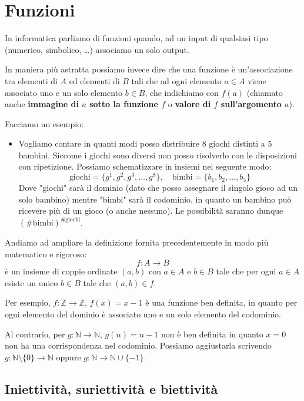 \documentclass[12pt]{report}
\newcommand{\N}{\mathbb{N}}
\newcommand{\Z}{\mathbb{Z}}
\begin{document}
	\chapter{Funzioni}
	
	In informatica parliamo di funzioni quando, ad un input di qualsiasi tipo (numerico, simbolico, \dots) associamo un solo output.
	
	In maniera più astratta possiamo invece dire che una funzione è un'associazione tra elementi di $A$ ed elementi di $B$ tali che ad ogni elemento $a \in A$ viene associato uno e un solo elemento $b \in B$, che indichiamo con $f(a)$ (chiamato anche \textbf{immagine di $a$ sotto la funzione $f$} o \textbf{valore di $f$ sull'argomento $a$}).
	
	Facciamo un esempio:
	\begin{itemize}
		\item Vogliamo contare in quanti modi posso distribuire $8$ giochi distinti a $5$ bambini. Siccome i giochi sono diversi non posso risolverlo con le disposizioni con ripetizione. Possiamo schematizzare in insiemi nel seguente modo:
		\[
		\text{giochi} = \{g^1, g^2, g^3, \dots, g^8\}, \quad \text{bimbi} = \{b_1, b_2, \dots, b_5\}
		\]
		Dove "giochi" sarà il dominio (dato che posso assegnare il singolo gioco ad un solo bambino) mentre "bimbi" sarà il codominio, in quanto un bambino può ricevere più di un gioco (o anche nessuno).
		Le possibilità saranno dunque $(\#\text{bimbi})^{\#\text{giochi}}$.
	\end{itemize}
	
	Andiamo ad ampliare la definizione fornita precedentemente in modo più matematico e rigoroso:
	\[
	f: A \to B
	\]
	è un insieme di coppie ordinate $(a, b)$ con $a \in A$ e $b \in B$ tale che per ogni $a \in A$ esiste un unico $b \in B$ tale che $(a, b) \in f$.
	
	Per esempio, $f: \Z \to \Z$, $f(x) = x - 1$ è una funzione ben definita, in quanto per ogni elemento del dominio è associato uno e un solo elemento del codominio.
	
	Al contrario, per $g: \N \to \N$, $g(n) = n - 1$ non è ben definita in quanto $x = 0$ non ha una corrispondenza nel codominio.
	Possiamo aggiustarla scrivendo $g: \N \setminus \{0\} \to \N$ oppure $g: \N \to \N \cup \{-1\}$.
	
	\section{Iniettività, suriettività e biettività}
	
\end{document}
